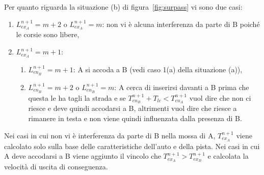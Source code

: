 \documentclass[11pt,a4paper]{report}
\begin{document}
Per quanto riguarda la situazione (b) di figura~\ref{fig:surpass} vi sono due casi:
\begin{enumerate}
\item $L_{ex_A}^{n+1} = m+2$ o $L_{ex_A}^{n+1} = m$: non vi è alcuna interferenza da parte di B poiché le corsie sono libere,
\item $L_{ex_A}^{n+1} = m+1$:
  \begin{enumerate}
  \item $L_{en_B}^{n+1} = m+1$: A si accoda a B (vedi caso 1(a) della situazione (a)),
  \item $L_{en_B}^{n+1} = m+2$ o $L_{en_B}^{n+1} = m$: A cerca di inserirsi davanti a B prima che questa le ha tagli la strada e se $T_{en_B}^{n+1} + T_{lc} < T_{en_A}^{n+1}$ vuol dire che non ci riesce e deve quindi accodarsi a B, altrimenti vuol dire che riesce a rimanere in testa e non viene quindi influenzata dalla presenza di B.
  \end{enumerate}
\end{enumerate}

Nei casi in cui non vi è interferenza da parte di B nella mossa di A, $T_{ex_A}^{n+1}$ viene calcolato solo sulla base delle caratteristiche dell'auto e della pista.
Nei casi in cui A deve accodarsi a B viene aggiunto il vincolo che $T_{ex_A}^{n+1} > T_{ex_B}^{n+1}$ e calcolata la velocità di uscita di conseguenza.
\end{document}
